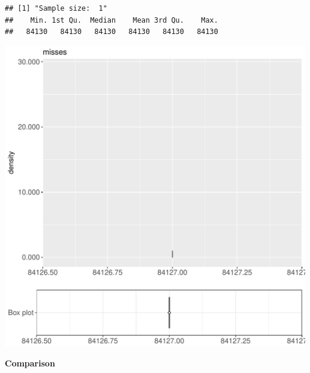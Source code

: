 \documentclass{article}\usepackage[]{graphicx}\usepackage[]{color}
\makeatletter
\def\maxwidth{ %
  \ifdim\Gin@nat@width>\linewidth
    \linewidth
  \else
    \Gin@nat@width
  \fi
}
\newenvironment{kframe}{%
 \def\at@end@of@kframe{}%
 \ifinner\ifhmode%
  \def\at@end@of@kframe{\end{minipage}}%
  \begin{minipage}{\columnwidth}%
 \fi\fi%
 \def\FrameCommand##1{\hskip\@totalleftmargin \hskip-\fboxsep
 \colorbox{shadecolor}{##1}\hskip-\fboxsep
     \hskip-\linewidth \hskip-\@totalleftmargin \hskip\columnwidth}%
 \MakeFramed {\advance\hsize-\width
   \@totalleftmargin\z@ \linewidth\hsize
   \@setminipage}}%
 {\par\unskip\endMakeFramed%
 \at@end@of@kframe}
\newenvironment{knitrout}{}{} %
\makeatother
\begin{document}
\begin{knitrout}
\color{fgcolor}\begin{kframe}
\begin{verbatim}
## [1] "Sample size:  1"
##    Min. 1st Qu.  Median    Mean 3rd Qu.    Max. 
##   84130   84130   84130   84130   84130   84130
\end{verbatim}


{\ttfamily\noindent\bfseries{}}\end{kframe}
\includegraphics[width=\maxwidth]{figure/RH4_trivialcaching_crime-1} 

\end{knitrout}
  
 \textbf{Comparison}
  
\end{document}
